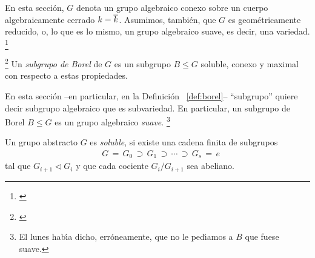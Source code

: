 En esta secci\'{o}n, $G$ denota un grupo algebraico conexo sobre un cuerpo
algebraicamente cerrado $k=\overline{k}$. Asumimos, tambi\'{e}n, que $G$ es
geom\'{e}tricamente reducido, o, lo que es lo mismo, un grupo algebraico suave,
es decir, una variedad.%
\footnote{
	\cite[pp.~12,13]{MilneAlgebraicGroups}
}

\begin{defBorel}\label{def:borel}
	\footnote{
		\cite[Definition~17.6]{MilneAlgebraicGroups}
	}
	Un \emph{subgrupo de Borel} de $G$ es un subgrupo $B\leq G$ soluble,
	conexo y maximal con respecto a estas propiedades.
\end{defBorel}

\begin{obsBorel}\label{obs:def:borel}
	En esta secci\'{o}n --en particular, en la Definici\'{o}n~%
	\ref{def:borel}-- ``subgrupo'' quiere decir subgrupo algebraico que
	es subvariedad. En particular, un subgrupo de Borel $B\leq G$ es un
	grupo algebraico \emph{suave}.%
	\footnote{
		El lunes hab\'{\i}a dicho, err\'{o}neamente, que no le
		ped\'{\i}amos a $B$ que fuese suave.
	}
\end{obsBorel}

Un grupo abstracto $G$ es \emph{soluble}, si existe una cadena finita de
subgrupos
\begin{align*}
	& G \,=\, G_0\,\supset\,G_1\,\supset\,\cdots\,\supset\,G_s\,=\,e
\end{align*}
%
tal que $G_{i+1}\triangleleft G_i$ y que cada cociente $G_i/G_{i+1}$ sea
abeliano.

